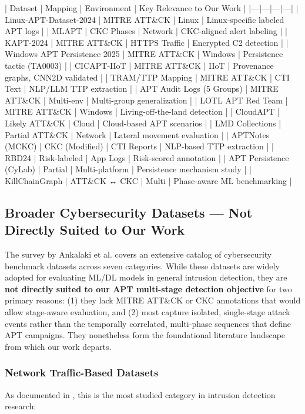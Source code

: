 | Dataset | Mapping | Environment | Key Relevance to Our Work |
|---|---|---|---|
| Linux-APT-Dataset-2024 | MITRE ATT\&CK | Linux | Linux-specific labeled APT logs |
| MLAPT | CKC Phases | Network | CKC-aligned alert labeling |
| KAPT-2024 | MITRE ATT\&CK | HTTPS Traffic | Encrypted C2 detection |
| Windows APT Persistence 2025 | MITRE ATT\&CK | Windows | Persistence tactic (TA0003) |
| CICAPT-IIoT \cite{ghiasvand2024cicapt} | MITRE ATT\&CK | IIoT | Provenance graphs, CNN2D validated |
| TRAM/TTP Mapping | MITRE ATT\&CK | CTI Text | NLP/LLM TTP extraction |
| APT Audit Logs (5 Groups) | MITRE ATT\&CK | Multi-env | Multi-group generalization |
| LOTL APT Red Team | MITRE ATT\&CK | Windows | Living-off-the-land detection |
| CloudAPT | Likely ATT\&CK | Cloud | Cloud-based APT scenarios |
| LMD Collections | Partial ATT\&CK | Network | Lateral movement evaluation |
| APTNotes (MCKC) | CKC (Modified) | CTI Reports | NLP-based TTP extraction |
| RBD24 | Risk-labeled | App Logs | Risk-scored annotation |
| APT Persistence (CyLab) | Partial | Multi-platform | Persistence mechanism study |
| KillChainGraph | ATT\&CK ↔ CKC | Multi | Phase-aware ML benchmarking |

\subsection{Broader Cybersecurity Datasets — Not Directly Suited to Our Work}

The survey by Ankalaki et al. \cite{ankalaki2025cyber} covers an extensive catalog of cybersecurity benchmark datasets across seven categories. While these datasets are widely adopted for evaluating ML/DL models in general intrusion detection, they are \textbf{not directly suited to our APT multi-stage detection objective} for two primary reasons: (1) they lack MITRE ATT\&CK or CKC annotations that would allow stage-aware evaluation, and (2) most capture isolated, single-stage attack events rather than the temporally correlated, multi-phase sequences that define APT campaigns. They nonetheless form the foundational literature landscape from which our work departs.

\subsubsection{Network Traffic-Based Datasets}

As documented in \cite{ankalaki2025cyber}, this is the most studied category in intrusion detection research:

